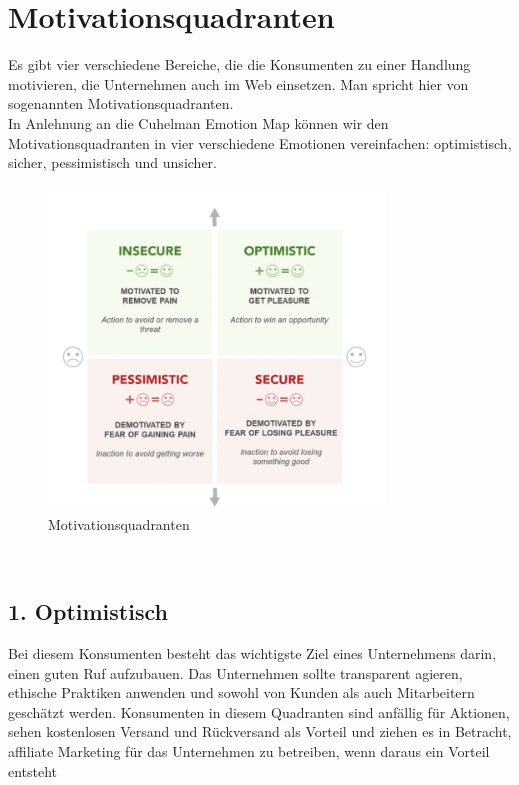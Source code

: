 \documentclass[./dokumentation.tex]{subfiles}
\begin{document}
\section{Motivationsquadranten}
Es gibt vier verschiedene Bereiche, die die Konsumenten zu einer Handlung motivieren, die Unternehmen auch im Web einsetzen. Man spricht hier von sogenannten Motivationsquadranten. \\
In Anlehnung an die Cuhelman Emotion Map können wir den Motivationsquadranten in vier verschiedene Emotionen vereinfachen: optimistisch, sicher, pessimistisch und unsicher. \\

\begin{figure}[h]
    \centering
    \includegraphics[width=0.8\textwidth]{bilder/motivationsquadranten.png}
    \caption{Motivationsquadranten \cite{designbro}}
    \label{fig9:motivationsquadranten}
\end{figure}\\

\subsection{1. Optimistisch}
Bei diesem Konsumenten besteht das wichtigste Ziel eines Unternehmens darin, einen guten Ruf aufzubauen. Das Unternehmen sollte transparent agieren, ethische Praktiken anwenden und sowohl von Kunden als auch Mitarbeitern geschätzt werden. Konsumenten in diesem Quadranten sind anfällig für Aktionen, sehen kostenlosen Versand und Rückversand als Vorteil und ziehen es in Betracht, affiliate Marketing für das Unternehmen zu betreiben, wenn daraus ein Vorteil entsteht \cite{designbro} \\
 
\end{document}
